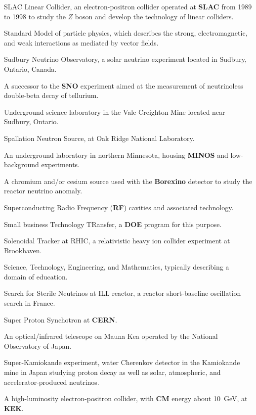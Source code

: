  SLAC Linear Collider, an electron-positron collider
operated at {\bf SLAC} from 1989 to 1998 to study the $Z$ boson and 
develop the technology of linear colliders.

 Standard Model of particle physics, which describes
the strong, electromagnetic, and weak interactions as mediated by 
vector fields.

 Sudbury Neutrino Observatory, a solar neutrino
experiment located in Sudbury, Ontario, Canada.

 A successor to the {\bf SNO} experiment aimed at the 
measurement of neutrinoless double-beta decay of tellurium.

 Underground science laboratory in the Vale Creighton Mine
located near Sudbury, Ontario.

 Spallation Neutron Source, at Oak Ridge National Laboratory.

 An underground laboratory in northern Minnesota,
housing {\bf MINOS} and low-background experiments.

 A chromium and/or cesium source used with the  {\bf
  Borexino}
detector 
to study the reactor neutrino anomaly.

 Superconducting Radio Frequency ({\bf RF}) cavities and 
      associated technology.

 Small business Technology TRansfer, a {\bf DOE}
program for this purpose.

 Solenoidal Tracker at RHIC, a relativistic heavy ion
collider experiment at Brookhaven.

  Science, Technology, Engineering, and Mathematics, 
   typically describing a domain of education.
 
 Search for Sterile Neutrinos at ILL reactor, a
reactor short-baseline oscillation search in France.

 Super Proton Synchotron at {\bf CERN}.

 An optical/infrared telescope on Mauna Kea operated
 by the National Observatory of Japan. 

 Super-Kamiokande experiment, water Cherenkov detector
in the Kamiokande mine in Japan studying proton decay as well as solar,
atmospheric, and accelerator-produced neutrinos.

  A high-luminosity electron-positron collider,
with
     {\bf CM} energy about 10~GeV, at 
      {\bf KEK}.

